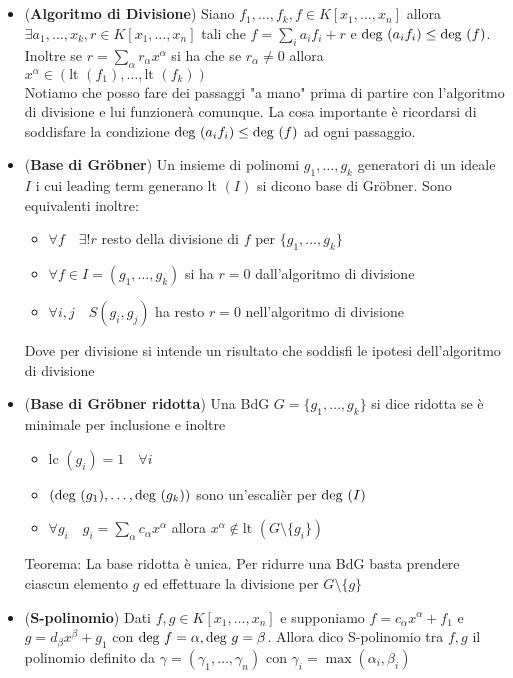 \documentclass[a4paper,NoNotes,GeneralMath]{stdmdoc}
\newcommand{\Lt}{\text{lt }}
\newcommand{\Lc}{\text{lc }}
\begin{document}
	\subsection*{}
	\begin{itemize}
		\item ({\bf Algoritmo di Divisione}) Siano $f_1, \ldots, f_k, f \in K[x_1, \ldots, x_n]$ allora $\exists a_1, \ldots, x_k, r \in K[x_1, \ldots, x_n]$ tali che $f = \sum_i a_i f_i + r$ e $\mbox{deg } (a_i f_i) \le \mbox{deg }(f)$. Inoltre se $r = \sum_\alpha r_\alpha x^\alpha$ si ha che se $r_\alpha \neq 0$ allora $x^\alpha \in (\Lt(f_1), \ldots, \Lt(f_k))$ \\
		Notiamo che posso fare dei passaggi "a mano" prima di partire con l'algoritmo di divisione e lui funzionerà comunque. La cosa importante è ricordarsi di soddisfare la condizione $\mbox{deg } (a_i f_i) \le \mbox{deg }(f)$ ad ogni passaggio.
		\item ({\bf Base di Gröbner}) Un insieme di polinomi $g_1, \ldots, g_k$ generatori di un ideale $I$ i cui leading term generano $\Lt(I)$ si dicono base di Gröbner. Sono equivalenti inoltre:
			\begin{itemize}
				\item $\forall f \quad \exists ! r$ resto della divisione di $f$ per $\{g_1, \ldots, g_k\}$
				\item $\forall f \in I = (g_1, \ldots, g_k)$ si ha $r = 0$ dall'algoritmo di divisione
				\item $\forall i,j \quad S(g_i, g_j)$ ha resto $r = 0$ nell'algoritmo di divisione
			\end{itemize}
		Dove per divisione si intende un risultato che soddisfi le ipotesi dell'algoritmo di divisione
		\item ({\bf Base di Gröbner ridotta}) Una BdG $G = \{ g_1, \ldots, g_k \}$ si dice ridotta se è minimale per inclusione e inoltre
			\begin{itemize}
				\item $\Lc(g_i) = 1 \quad \forall i$
				\item $(\mbox{deg }(g_1), \ldots, \mbox{deg }(g_k))$ sono un'escalièr per $\mbox{deg }(I)$
				\item $\forall g_i \quad g_i = \sum_\alpha c_\alpha x^\alpha$ allora $x^\alpha \notin \Lt(G \setminus \{g_i\})$
			\end{itemize}
		Teorema: La base ridotta è unica. Per ridurre una BdG basta prendere ciascun elemento $g$ ed effettuare la divisione per $G \setminus \{g\}$
		\item ({\bf S-polinomio}) Dati $f, g \in K[x_1, \ldots, x_n]$ e supponiamo $f = c_\alpha x^\alpha + f_1$ e $g = d_\beta x^\beta + g_1$ con $\mbox{deg } f = \alpha, \mbox{deg } g = \beta$. Allora dico S-polinomio tra $f, g$ il polinomio definito da $\gamma = (\gamma_1, \ldots, \gamma_n)$ con $\gamma_i = \max(\alpha_i, \beta_i)$

\end{itemize}
\end{document}
